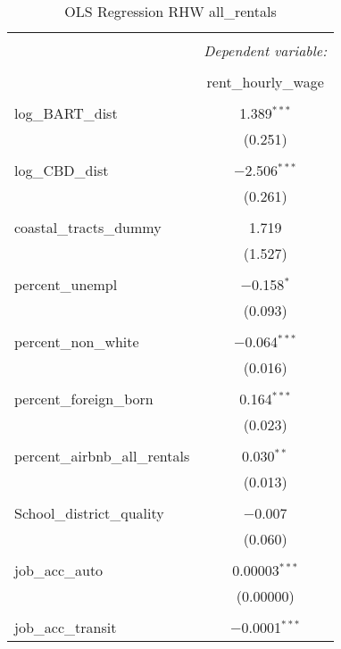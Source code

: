 \documentclass[10pt, letterpaper]{amsart}
\begin{document}
\begin{table}[H] \centering 
  \caption{OLS Regression RHW all\_rentals}
  \label{} 
  \begin{tabular}{@{\extracolsep{5pt}}lc} 
    \\[-1.8ex]\hline 
    \hline \\[-1.8ex] 
    & \multicolumn{1}{c}{\textit{Dependent variable:}} \\ 
    \cline{2-2} 
    \\[-1.8ex] & rent\_hourly\_wage \\ 
    \hline \\[-1.8ex] 
    log\_BART\_dist & 1.389$^{***}$ \\ 
    & (0.251) \\ 
    & \\ 
    log\_CBD\_dist & $-$2.506$^{***}$ \\ 
    & (0.261) \\ 
    & \\ 
    coastal\_tracts\_dummy & 1.719 \\ 
    & (1.527) \\ 
    & \\ 
    percent\_unempl & $-$0.158$^{*}$ \\ 
    & (0.093) \\ 
    & \\ 
    percent\_non\_white & $-$0.064$^{***}$ \\ 
    & (0.016) \\ 
    & \\ 
    percent\_foreign\_born & 0.164$^{***}$ \\ 
    & (0.023) \\ 
    & \\ 
    percent\_airbnb\_all\_rentals & 0.030$^{**}$ \\ 
    & (0.013) \\ 
    & \\ 
    School\_district\_quality & $-$0.007 \\ 
    & (0.060) \\ 
    & \\ 
    job\_acc\_auto & 0.00003$^{***}$ \\ 
    & (0.00000) \\ 
    & \\ 
    job\_acc\_transit & $-$0.0001$^{***}$ \\ 

\end{tabular}
\end{table}
\end{document}
